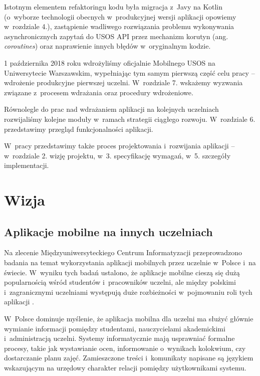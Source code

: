 \documentclass{pracamgr}
\begin{document}
Istotnym elementem refaktoringu kodu była migracja z~Javy na Kotlin (o~wyborze technologii obecnych w~produkcyjnej wersji
aplikacji opowiemy w~rozdziale 4.), zastąpienie wadliwego rozwiązania problemu
wykonywania asynchronicznych zapytań do USOS API przez mechanizm korutyn 
(ang. \textit{coroutines}) oraz naprawienie innych błędów w~oryginalnym kodzie.

1 października 2018 roku wdrożyliśmy oficjalnie Mobilnego USOS na Uniwersytecie Warszawskim,
wypełniając tym samym pierwszą część celu pracy -- wdrożenie produkcyjne pierwszej uczelni.
W~rozdziale 7. wskażemy wyzwania związane z~procesem wdrażania oraz procedury wdrożeniowe.

Równolegle do prac nad wdrażaniem aplikacji na kolejnych uczelniach rozwijaliśmy kolejne
moduły w~ramach strategii ciągłego rozwoju. W~rozdziale 6. przedstawimy przegląd
funkcjonalności aplikacji.

W~pracy przedstawimy także proces projektowania i~rozwijania aplikacji -- w~rozdziale 2.
wizję projektu, w~3. specyfikację wymagań, w~5. szczegóły implementacji.


\chapter{Wizja}

\section{Aplikacje mobilne na innych uczelniach}

Na zlecenie Międzyuniwersyteckiego Centrum Informatyzacji \cite{muci} przeprowadzono
badania na temat wykorzystania aplikacji mobilnych przez uczelnie w~Polsce i~na świecie. W~wyniku tych badań ustalono, że aplikacje mobilne
cieszą się dużą popularnością wśród studentów i~pracowników uczelni, ale
między polskimi i~zagranicznymi uczelniami występują duże rozbieżności w~pojmowaniu
roli tych aplikacji \cite{przegladaplikacji}.

W~Polsce dominuje myślenie, że aplikacja mobilna dla uczelni ma służyć głównie
wymianie informacji pomiędzy studentami, nauczycielami akademickimi i~administracją
uczelni. Systemy informatycznie mają usprawniać formalne procesy, takie jak
wystawianie ocen, informowanie o~wynikach kolokwium, czy dostarczanie 
planu zajęć. Zamieszczone treści i~komunikaty napisane są językiem wskazującym na
urzędowy charakter relacji pomiędzy użytkownikami systemu.
\end{document}
